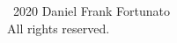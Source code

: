\thispagestyle{empty}
\noindent\textcopyright\ 2020 Daniel Frank Fortunato \\
All rights reserved.
\vfill
\cleardoublepage
